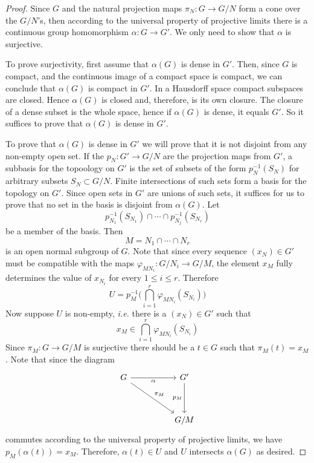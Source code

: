 \documentclass[12pt]{article}
\theoremstyle{definition}
\theoremstyle{remark}
\begin{document}
    \begin{proof}
        Since $G$ and the natural projection maps $\pi_N\colon G\to G/N$ form a cone over the $G/N$'s, then according to the universal property of projective limits there is a continuous group homomorphism $\alpha\colon G\to G'$. We only need to show that $\alpha$ is surjective.

        To prove surjectivity, first assume that $\alpha(G)$ is dense in $G'$. Then, since $G$ is compact, and the continuous image of a compact space is compact, we can conclude that $\alpha(G)$ is compact in $G'$. In a Hausdorff space compact subspaces are closed. Hence $\alpha(G)$ is closed and, therefore, is its own closure. The closure of a dense subset is the whole space, hence if $\alpha(G)$ is dense, it equals $G'$. So it suffices to prove that $\alpha(G)$ is dense in $G'$.

        To prove that $\alpha(G)$ is dense in $G'$ we will prove that it is not disjoint from any non-empty open set. If the $p_N\colon G'\to G/N$ are the projection maps from $G'$, a subbasis for the topoology on $G'$ is the set of subsets of the form $p^{-1}_N(S_N)$ for arbitrary subsets $S_N\subset G/N$. Finite intersections of such sets form a basis for the topology on $G'$. Since open sets in $G'$ are unions of such sets, it suffices for us to prove that no set in the basis is disjoint from $\alpha(G)$. Let
        $$p^{-1}_{N_1}(S_{N_1})\cap\cdots\cap p^{-1}_{N_j}(S_{N_r})$$
        be a member of the basis. Then
        $$M=N_1\cap\cdots\cap N_r$$
        is an open normal subgroup of $G$. Note that since every sequence $(x_N)\in G'$ must be compatible with the maps $\varphi_{MN_i}\colon G/N_i\to G/M$, the element $x_M$ fully determines the value of $x_{N_i}$ for every $1\leq i\leq r$. Therefore
        $$
        U = p^{-1}_M\bigg(\bigcap_{i=1}^{r} \varphi_{MN_i}(S_{N_i})\bigg)
        $$
        Now suppose $U$ is non-empty, \emph{i.e.} there is a $(x_N)\in G'$ such that
        $$x_M\in \bigcap_{i=1}^{r} \varphi_{MN_i}(S_{N_i})$$
        Since $\pi_M\colon G\to G/M$ is surjective there should be a $t\in G$ such that $\pi_M(t)=x_M$. Note that since the diagram
        \[\begin{tikzcd}
            G && {G'} \\
            \\
            && {G/M}
            \arrow["\alpha"', from=1-1, to=1-3]
            \arrow["{\pi_M}", from=1-1, to=3-3]
            \arrow["{p_M}"', from=1-3, to=3-3]
        \end{tikzcd}\]
        commutes according to the universal property of projective limits, we have $p_M(\alpha(t))=x_M$. Therefore, $\alpha(t)\in U$ and $U$ intersects $\alpha(G)$ as desired.
    \end{proof}
\end{document}
